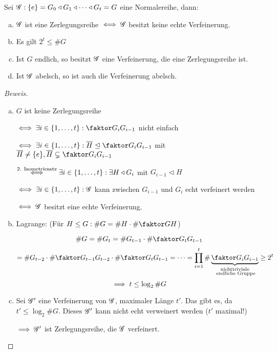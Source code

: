 \documentclass[a4paper]{report}
\begin{document}
\begin{prop} %
  Sei $\mathscr{G} : \{e\} = G_{0} \triangleleft G_{1} \triangleleft \cdots \triangleleft G_{t} = G$ eine Normalereihe, dann:
  \begin{enumerate}[(a)]
    \item $\mathscr{G}$ ist eine Zerlegungsreihe $\iff \mathscr{G}$ besitzt keine echte Verfeinerung.
    \item Es gilt $2^{t} \le \#G$
    \item Ist $G$ endlich, so besitzt $\mathscr{G}$ eine Verfeinerung, die eine Zerlegungsreihe ist.
    \item Ist $\mathscr{G}$ abelsch, so ist auch die Verfeinerung abelsch.
  \end{enumerate}
\begin{proof}[Beweis]
  \begin{enumerate}[(a)]
    \item $G$ ist keine Zerlegungsreihe

          $\iff \ex i \in \eb t : \fak {G_{i}}{G_{i-1}}$ nicht einfach

          $\iff \ex i \in \eb t : \bar H \nt \fak {G_{i}}{G_{i-1}}$ mit $\bar H \ne \{e\}, \bar H \subsetneq \fak {G_{i}}{G_{i-1}}$

          $\overset{\text{2. Isometriesatz}} \iff \exists i \in \{1, \ldots, t\} : \exists H \triangleleft G_{i} $ mit $G_{i-1} \triangleleft H$

          $\iff \exists i \in \{1, \ldots, t\} : \mathscr{G}$ kann zwischen $G_{i-1}$ und $G_{i}$ echt verfeinert werden

          $\iff \mathscr{G}$ besitzt eine echte Verfeinerung.

    \item Lagrange: (Für $H \le G : \#G = \#H \cdot \# \fak GH$)

          \[\#G = \#G_{t} = \#G_{t-1} \cdot \#\fak{G_{t}}{G_{t-1}}\]
          \[= \#G_{t-2} \cdot \# \fak {G_{t-1}}{G_{t-2}}\cdot \#\fak{G_{t}}{G_{t-1}} = \cdots = \prod_{i=1}^{t}\#\ubr{\fak{G_{i}}{G_{i-1}}}_{\substack{\text{nichttriviale}\\ \text{ endliche Gruppe}}} \ge 2^{t}\]
          \[\implies t \le \log_{2} \#G\]
    \item Sei $\mathscr{G}'$ eine Verfeinerung von $\mathscr{G}$, maximaler Länge $t'$. Das gibt es, da $t' \le \log_{2} \#G$. Dieses $\mathscr{G}'$ kann nicht echt verweinert werden ($t'$ maximal!)

          $\implies \mathscr{G}'$ ist Zerlegungsreihe, die $\mathscr{G}$ verfeinert.


\end{enumerate}
\end{proof}
\end{prop}
\end{document}
